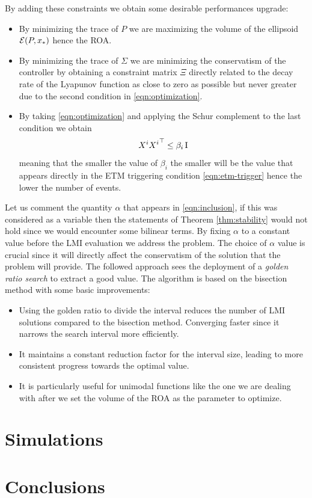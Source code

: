 \documentclass{ifacconf}
\theoremstyle{plain}
\begin{document}
By adding these constraints we obtain some desirable performances upgrade:
\begin{itemize}
  \item By minimizing the trace of $P$ we are maximizing the volume of the ellipsoid ${\mathcal{E}}(P, x_*)$ hence the ROA.
  \item By minimizing the trace of $\Sigma$ we are minimizing the conservatism of the controller by obtaining a constraint matrix $\Xi$ directly related to the decay rate of the Lyapunov function as close to zero as possible but never greater due to the second condition in \eqref{eqn:optimization}.
  \item By taking \eqref{eqn:optimization} and applying the Schur complement to the last condition we obtain
  $$
  X^i {X^i}^\top \leq \beta_i \operatorname{I}
  $$
  meaning that the smaller the value of $\beta_i$ the smaller will be the value that appears directly in the ETM triggering condition \eqref{eqn:etm-trigger} hence the lower the number of events.
\end{itemize}

Let us comment the quantity $\alpha$ that appears in \eqref{eqn:inclusion}, if this was considered as a variable then the statements of Theorem \ref{thm:stability} would not hold since we would encounter some bilinear terms. By fixing $\alpha$ to a constant value before the LMI evaluation we address the problem. The choice of $\alpha$ value is crucial since it will directly affect the conservatism of the solution that the problem will provide. The followed approach sees the deployment of a \emph{golden ratio search} to extract a good value. The algorithm is based on the bisection method with some basic improvements:
\begin{itemize}
  \item Using the golden ratio to divide the interval reduces the number of LMI solutions compared to the bisection method. Converging faster since it narrows the search interval more efficiently.
  \item It maintains a constant reduction factor for the interval size, leading to more consistent progress towards the optimal value.
  \item It is particularly useful for unimodal functions like the one we are dealing with after we set the volume of the ROA as the parameter to optimize.
\end{itemize}

\section{Simulations}

\section{Conclusions}

%

\end{document}
